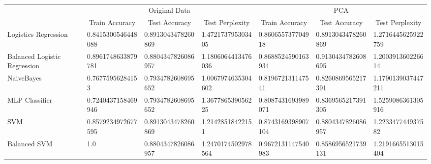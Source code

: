 \documentclass{article}
\begin{document}
\begin{table}[]
\begin{tabular}{l|lll|lll|}
\cline{2-7}
                                                   & \multicolumn{3}{c|}{Original Data}                                                                                       & \multicolumn{3}{c|}{PCA}                                                                                                 \\ \cline{2-7} 
                                                   & \multicolumn{1}{c|}{Train Accuracy}     & \multicolumn{1}{c|}{Test Accuracy}      & \multicolumn{1}{c|}{Test Perplexity} & \multicolumn{1}{c|}{Train Accuracy}     & \multicolumn{1}{c|}{Test Accuracy}      & \multicolumn{1}{c|}{Test Perplexity} \\ \hline
\multicolumn{1}{|l|}{Logistics Regression}         & \multicolumn{1}{l|}{0.8415300546448088} & \multicolumn{1}{l|}{0.8913043478260869} & 1.472173795303405                    & \multicolumn{1}{l|}{0.860655737704918}  & \multicolumn{1}{l|}{0.8913043478260869} & 1.2716445625922759                   \\ \hline
\multicolumn{1}{|l|}{Balanced Logistic Regression} & \multicolumn{1}{l|}{0.8961748633879781} & \multicolumn{1}{l|}{0.8804347826086957} & 1.1806064413476036                   & \multicolumn{1}{l|}{0.8688524590163934} & \multicolumn{1}{l|}{0.9130434782608695} & 1.200391360226614                    \\ \hline
\multicolumn{1}{|l|}{NaiveBayes}                   & \multicolumn{1}{l|}{0.76775956284153}   & \multicolumn{1}{l|}{0.7934782608695652} & 1.0067974635304602                   & \multicolumn{1}{l|}{0.819672131147541}  & \multicolumn{1}{l|}{0.8260869565217391} & 1.1790139037447211                   \\ \hline
\multicolumn{1}{|l|}{MLP Classifier}               & \multicolumn{1}{l|}{0.7240437158469946} & \multicolumn{1}{l|}{0.7934782608695652} & 1.367786539056225                    & \multicolumn{1}{l|}{0.8087431693989071} & \multicolumn{1}{l|}{0.8369565217391305} & 1.5259086361305916                   \\ \hline
\multicolumn{1}{|l|}{SVM}                          & \multicolumn{1}{l|}{0.8579234972677595} & \multicolumn{1}{l|}{0.8913043478260869} & 1.21428518422151                     & \multicolumn{1}{l|}{0.8743169398907104} & \multicolumn{1}{l|}{0.8804347826086957} & 1.223347744937582                    \\ \hline
\multicolumn{1}{|l|}{Balanced SVM}                 & \multicolumn{1}{l|}{1.0}                & \multicolumn{1}{l|}{0.8804347826086957} & 1.2470174502978564                   & \multicolumn{1}{l|}{0.9672131147540983} & \multicolumn{1}{l|}{0.8586956521739131} & 1.2191665513015404                   \\ \hline

\end{tabular}
\end{table}
\end{document}
